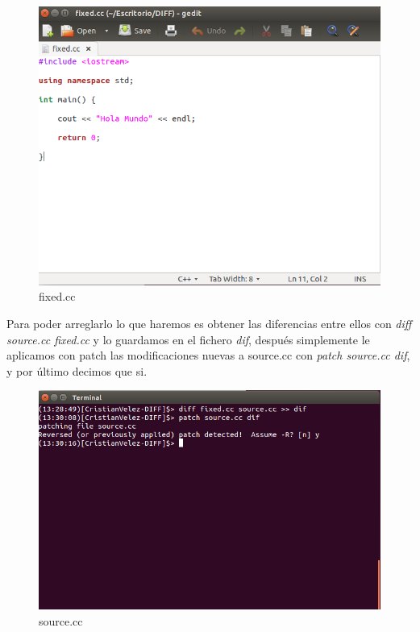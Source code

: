 	\begin{figure}[H]
	\centering
	\includegraphics[scale=0.35]{pics/fixed.png}  
	\caption{fixed.cc} \label{fig:fixed.cc}
	\end{figure}

Para poder arreglarlo lo que haremos es obtener las diferencias entre ellos con \textit{diff source.cc fixed.cc} y lo guardamos en el fichero \textit{dif}, después simplemente le aplicamos con patch las modificaciones nuevas a source.cc con \textit{patch source.cc dif}, y por último decimos que si.

	\begin{figure}[H]
	\centering
	\includegraphics[scale=0.35]{pics/cambios.png}
	\caption{source.cc} \label{fig:sourcefixed.cc}
	\end{figure}

